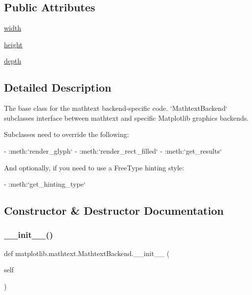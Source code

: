 \subsection*{Public Attributes}
\begin{DoxyCompactItemize}
\item 
\hyperlink{classmatplotlib_1_1mathtext_1_1MathtextBackend_ad814a6749327f635a37e31146d4dfa65}{width}
\item 
\hyperlink{classmatplotlib_1_1mathtext_1_1MathtextBackend_ae7787c5fd41ffdb57b64865e397d3cd6}{height}
\item 
\hyperlink{classmatplotlib_1_1mathtext_1_1MathtextBackend_a8c5a95b8ca9f470f04d829216f13658c}{depth}
\end{DoxyCompactItemize}


\subsection{Detailed Description}
\begin{DoxyVerb}The base class for the mathtext backend-specific code.  `MathtextBackend`
subclasses interface between mathtext and specific Matplotlib graphics
backends.

Subclasses need to override the following:

- :meth:`render_glyph`
- :meth:`render_rect_filled`
- :meth:`get_results`

And optionally, if you need to use a FreeType hinting style:

- :meth:`get_hinting_type`
\end{DoxyVerb}
 

\subsection{Constructor \& Destructor Documentation}
\mbox{\label{classmatplotlib_1_1mathtext_1_1MathtextBackend_a11b11ee83093b7f054b23afea850c583}} 
\subsubsection{\texorpdfstring{\+\_\+\+\_\+init\+\_\+\+\_\+()}{\_\_init\_\_()}}
{\footnotesize\ttfamily def matplotlib.\+mathtext.\+Mathtext\+Backend.\+\_\+\+\_\+init\+\_\+\+\_\+ (\begin{DoxyParamCaption}\item[{}]{self }\end{DoxyParamCaption})}




